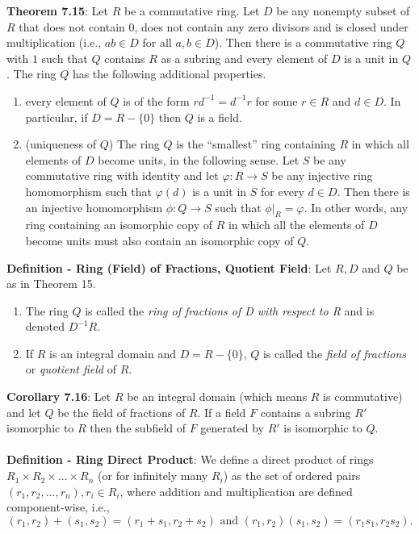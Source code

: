 \documentclass{article}
\begin{document}
\textbf{Theorem 7.15}: Let $R$ be a commutative ring. Let $D$ be any nonempty subset of $R$ that does not contain $0$, does not contain any zero divisors and is closed under multiplication (i.e., $ab \in D$ for all $a, b \in D$). Then there is a commutative ring $Q$ with $1$ such that $Q$ contains $R$ as a subring and every element of $D$ is a unit in $Q$. The ring $Q$ has the following additional properties. \begin{enumerate}
    \item every element of $Q$ is of the form $rd^{-1} = d^{-1}r$ for some $r \in R$ and $d \in D$. In particular, if $D = R - \{0\}$ then $Q$ is a field.
    \item (uniqueness of $Q$) The ring $Q$ is the ``smallest'' ring containing $R$ in which all elements of $D$ become units, in the following sense. Let $S$ be any commutative ring with identity and let $\varphi: R \rightarrow S$ be any injective ring homomorphism such that $\varphi(d)$ is a unit in $S$ for every $d \in D$. Then there is an injective homomorphism $\phi: Q \rightarrow S$ such that $\phi|_R = \varphi.$ In other words, any ring containing an isomorphic copy of $R$ in which all the elements of $D$ become units must also contain an isomorphic copy of $Q$. 
\end{enumerate} $ $ \\
\textbf{Definition - Ring (Field) of Fractions, Quotient Field}: Let $R, D$ and $Q$ be as in Theorem 15. \begin{enumerate}
    \item The ring $Q$ is called the \textit{ring of fractions of D with respect to R} and is denoted $D^{-1}R$.
    \item If $R$ is an integral domain and $D = R - \{0\}$, $Q$ is called the \textit{field of fractions} or \textit{quotient field} of $R$.
\end{enumerate} $ $ \\
\textbf{Corollary 7.16}: Let $R$ be an integral domain (which means $R$ is commutative) and let $Q$ be the field of fractions of $R$. If
a field $F$ contains a subring $R'$ isomorphic to $R$ then the subfield of $F$ generated by $R'$ is isomorphic to $Q$. \\ \\
\textbf{Definition - Ring Direct Product}: We define a direct product of rings $R_1 \times R_2 \times \dots \times R_n$ (or for infinitely many $R_i$) as the set of ordered pairs $(r_1, r_2, \dots, r_n), r_i \in R_i$, where addition and multiplication are defined component-wise, i.e., $$(r_1, r_2) + (s_1, s_2) = (r_1 + s_1, r_2 + s_2) \text{ and } (r_1, r_2)(s_1, s_2) = (r_1 s_1, r_2 s_2).$$ \\
\end{document}
